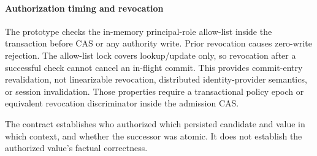 \paragraph{Authorization timing and revocation}
\label{sec:authorization-timing}
The prototype checks the in-memory principal-role allow-list inside the transaction before CAS or any authority write. Prior revocation causes zero-write rejection. The allow-list lock covers lookup/update only, so revocation after a successful check cannot cancel an in-flight commit. This provides commit-entry revalidation, not linearizable revocation, distributed identity-provider semantics, or session invalidation. Those properties require a transactional policy epoch or equivalent revocation discriminator inside the admission CAS.

The contract establishes who authorized which persisted candidate and value in which context, and whether the successor was atomic. It does not establish the authorized value's factual correctness.



